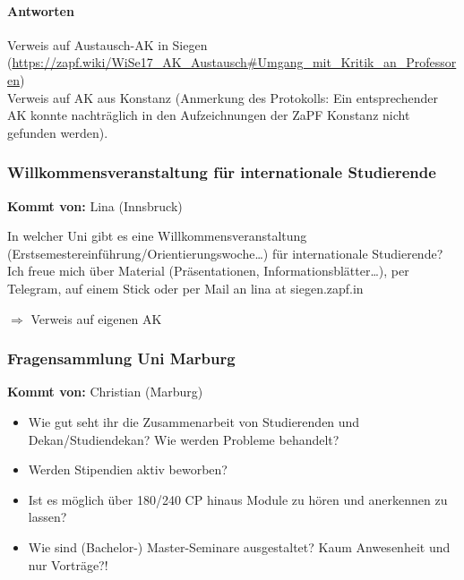       \paragraph{Antworten}
        Verweis auf Austausch-AK in Siegen (\url{https://zapf.wiki/WiSe17_AK_Austausch#Umgang_mit_Kritik_an_Professoren}) \\
        Verweis auf AK aus Konstanz (Anmerkung des Protokolls: Ein entsprechender AK konnte nachträglich in den Aufzeichnungen der ZaPF Konstanz nicht gefunden werden).

    \subsubsection*{Willkommensveranstaltung für internationale Studierende}
      \textbf{Kommt von:} Lina (Innsbruck)

In welcher Uni gibt es eine Willkommensveranstaltung (Erstsemestereinführung/Orientierungswoche…) für internationale Studierende?
Ich freue mich über Material (Präsentationen, Informationsblätter…), per Telegram, auf einem Stick oder per Mail an lina at siegen.zapf.in

    $\Rightarrow$ Verweis auf eigenen AK

    \subsubsection*{Fragensammlung Uni Marburg}
      \textbf{Kommt von:} Christian (Marburg)
        \begin{itemize}
          \item Wie gut seht ihr die Zusammenarbeit von Studierenden und Dekan/Studiendekan? Wie werden Probleme behandelt?
          \item Werden Stipendien aktiv beworben?
          \item Ist es möglich über 180/240 CP hinaus Module zu hören und anerkennen zu lassen?
          \item Wie sind (Bachelor-) Master-Seminare ausgestaltet? Kaum Anwesenheit und nur Vorträge?!
        \end{itemize}

